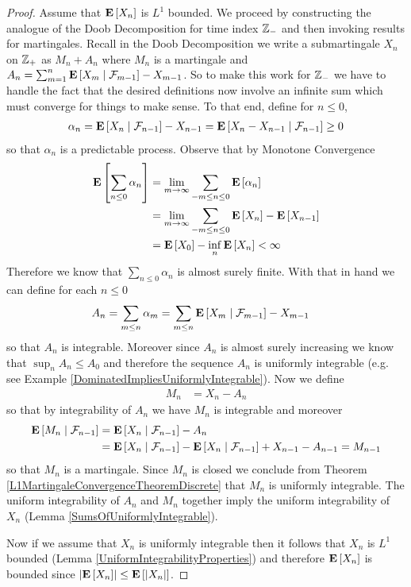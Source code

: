 \begin{proof}
Assume that $\expectation{X_n}$ is $L^1$ bounded.  We proceed by constructing the
analogue of the Doob Decomposition for time index $\integers_-$ and
then invoking results for martingales.  Recall in the Doob
Decomposition we write a submartingale $X_n$ on $\integers_+$ as $M_n
+ A_n$ where $M_n$ is a martingale and $A_n = \sum_{m=1}^n
\cexpectationlong{\mathcal{F}_{m-1}}{X_m} - X_{m-1}$.  So to make this
work for $\integers_-$ we have to handle the fact that the desired
definitions now involve an infinite sum which must converge for things
to make sense.  To
that end, define for $n \leq 0$,
\begin{align*}
\alpha_n = \cexpectationlong{\mathcal{F}_{n-1}}{X_n} - X_{n-1} =
\cexpectationlong{\mathcal{F}_{n-1}}{X_n - X_{n-1}} \geq 0
\end{align*}
so that $\alpha_n$ is a predictable process.  Observe that by Monotone Convergence
\begin{align*}
\expectation{\sum_{n \leq 0} \alpha_n}
&= \lim_{m \to \infty} \sum_{-m \leq n \leq 0} \expectation{ \alpha_n} \\
&= \lim_{m \to \infty} \sum_{-m \leq n \leq 0}
\expectation{X_n} - \expectation{X_{n-1}} \\
&= \expectation{X_0} - \inf_n \expectation{X_n} < \infty \\
\end{align*}
Therefore we know that $\sum_{n \leq 0} \alpha_n$ is almost surely
finite.  With that in hand we can define for each $n \leq 0$
\begin{align*}
A_n &= \sum_{m \leq n} \alpha_m = \sum_{m \leq n}
\cexpectationlong{\mathcal{F}_{m-1}}{X_m} - X_{m-1}
\end{align*}
so that $A_n$ is integrable.  Moreover since $A_n$ is almost surely
increasing we know that $\sup_{n} A_n \leq A_0$ and therefore the
sequence $A_n$ is
uniformly integrable (e.g. see Example \ref{DominatedImpliesUniformlyIntegrable}).
Now we define
\begin{align*}
M_n &= X_n - A_n
\end{align*}
so that by integrability of $A_n$ we have $M_n$ is integrable and
moreover
\begin{align*}
\cexpectationlong{\mathcal{F}_{n-1}}{M_n} &=
\cexpectationlong{\mathcal{F}_{n-1}}{X_n} - A_n \\
&=\cexpectationlong{\mathcal{F}_{n-1}}{X_n} -
\cexpectationlong{\mathcal{F}_{n-1}}{X_n} + X_{n-1} - A_{n-1} = M_{n-1}\\
\end{align*}
so that $M_n$ is a martingale.  Since $M_n$ is closed we conclude from 
Theorem \ref{L1MartingaleConvergenceTheoremDiscrete} that $M_n$ is
uniformly integrable.  The uniform integrability of $A_n$ and $M_n$
together imply the uniform integrability of $X_n$ (Lemma \ref{SumsOfUniformlyIntegrable}).

Now if we assume that $X_n$ is uniformly integrable then it follows
that $X_n$ is $L^1$ bounded (Lemma
\ref{UniformIntegrabilityProperties}) and therefore
$\expectation{X_n}$ is bounded since $\abs{\expectation{X_n}} \leq \expectation{\abs{X_n}}$.
\end{proof}

